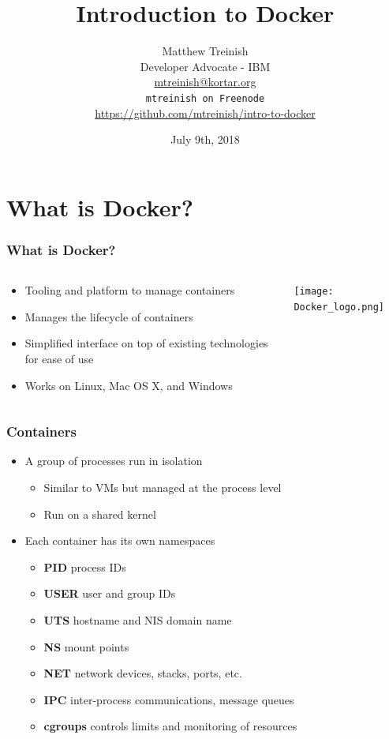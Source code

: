 \documentclass[aspectratio=169,11pt,hyperref={colorlinks=true}]{beamer}
\author[Matthew Treinish]{%
    \texorpdfstring{%
        \centering
        Matthew Treinish\\
        Developer Advocate - IBM \\
        \href{mailto:mtreinish@kortar.org}{mtreinish@kortar.org}\\
        \texttt{mtreinish on Freenode}\\
        \href{https://github.com/mtreinish/intro-to-docker}{https://github.com/mtreinish/intro-to-docker}
   }
   {Matthew Treinish}
}
\date{July 9th, 2018}
\title{Introduction to Docker}
\begin{document}
\titlepage

\section{What is Docker?}
\begin{frame}
    \frametitle{What is Docker?}
    \begin{columns}[T]
        \begin{column}{.48\textwidth}
            \begin{itemize}
                \item Tooling and platform to manage containers
                \item Manages the lifecycle of containers
                \item Simplified interface on top of existing technologies for ease of use
                \item Works on Linux, Mac OS X, and Windows
            \end{itemize}
        \end{column}
        \begin{column}{.48\textwidth}
            \texttt{[image: Docker\_logo.png]}
        \end{column} 
    \end{columns}
\end{frame}

\begin{frame}
    \frametitle{Containers}
    \begin{itemize}
    \item A group of processes run in isolation
        \begin{itemize}
            \item Similar to VMs but managed at the process level
            \item Run on a shared kernel
        \end{itemize}
    \item Each container has its own namespaces
        \begin{itemize}
            \item \textbf{PID} process IDs
            \item \textbf{USER} user and group IDs
            \item \textbf{UTS} hostname and NIS domain name
            \item \textbf{NS} mount points
            \item \textbf{NET} network devices, stacks, ports, etc.
            \item \textbf{IPC} inter-process communications, message queues
            \item \textbf{cgroups} controls limits and monitoring of resources
        \end{itemize}
    \end{itemize}
\end{frame}
\end{document}
